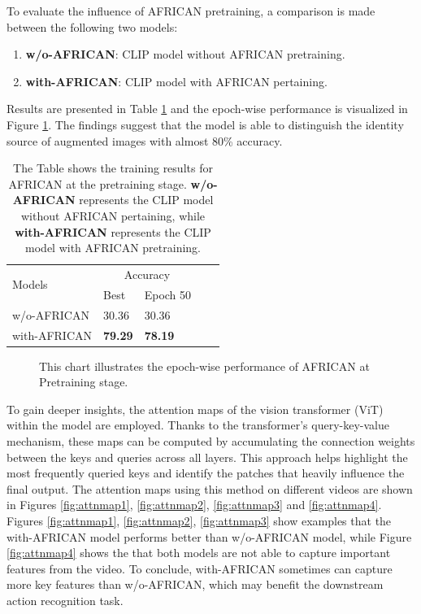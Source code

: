 To evaluate the influence of AFRICAN pretraining, a comparison is made between the following two models: 

\begin{enumerate}
    \item \textbf{w/o-AFRICAN}: CLIP model without AFRICAN pretraining.
    \item \textbf{with-AFRICAN}: CLIP model with AFRICAN pertaining.
\end{enumerate}

Results are presented in Table \ref{tab:africanpretrainingresults} and the epoch-wise performance is visualized in Figure \ref{fig:tp_africanpretraining}. The findings suggest that the model is able to distinguish the identity source of augmented images with almost 80\% accuracy. 

\begin{table}[ht]
    \centering
    \caption[Training Results for AFRICAN at Pretraining stage]{The Table shows the training results for AFRICAN at the pretraining stage. \textbf{w/o-AFRICAN} represents the CLIP model without AFRICAN pertaining, while \textbf{with-AFRICAN} represents the CLIP model with AFRICAN pretraining.
}
    \label{tab:africanpretrainingresults}
    \begin{tabular}{lllll}
        \toprule
        \multirow{2}{*}{Models} & \multicolumn{2}{c}{Accuracy} \\
        \cmidrule{2-3} 
        {} &  Best & Epoch 50\\
        \midrule
        w/o-AFRICAN   & 30.36 & 30.36 \\
        with-AFRICAN  & \textbf{79.29} & \textbf{78.19} \\
        \bottomrule
    \end{tabular}
\end{table}

\begin{figure}[ht]
    \centering
    \resizebox{0.8\textwidth}{!}{}
    \caption[Accuracy of AFRICAN on each Epoch at Pretraining stage]{This chart illustrates the epoch-wise performance of AFRICAN at Pretraining stage.}
    \label{fig:tp_africanpretraining}
\end{figure}

To gain deeper insights, the attention maps of the vision transformer (ViT) within the model are employed. Thanks to the transformer's query-key-value mechanism, these maps can be computed by accumulating the connection weights between the keys and queries across all layers. This approach helps highlight the most frequently queried keys and identify the patches that heavily influence the final output. The attention maps using this method on different videos are shown in Figures \ref{fig:attnmap1}, \ref{fig:attnmap2}, \ref{fig:attnmap3} and \ref{fig:attnmap4}. Figures \ref{fig:attnmap1}, \ref{fig:attnmap2}, \ref{fig:attnmap3} show examples that the with-AFRICAN model performs better than w/o-AFRICAN model, while Figure \ref{fig:attnmap4} shows the that both models are not able to capture important features from the video. To conclude,  with-AFRICAN sometimes can capture more key features than w/o-AFRICAN, which may benefit the downstream action recognition task.

